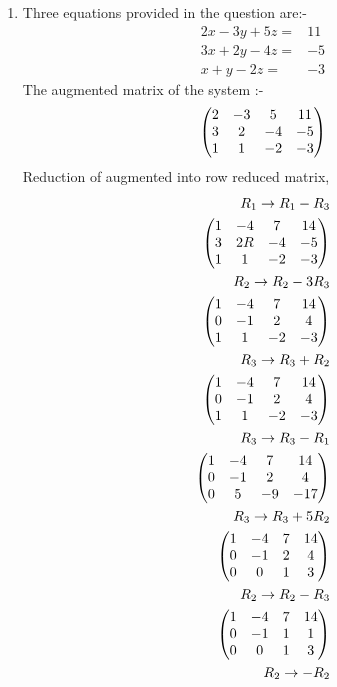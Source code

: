 \documentclass[two column]{article}
\begin{document}
            \begin{enumerate}
            \item
            Three equations provided in the question are:-
               \begin{align}
                   2x-3y+5z=&11\\
                   3x+2y-4z=&-5\\
                   x+y-2z=&-3
               \end{align}
                 The augmented matrix of the system :-
                 \begin{align}
                 \begin{pmatrix} 2 & -3 & 5 & 11\\ 3 & 2 & -4 & -5\\ 1 & 1 & -2 & -3\end{pmatrix}
                 \end{align}
                  Reduction of  augmented into row reduced matrix,
                  \begin{align}
                  R_1\rightarrow  R_1-R_3\\
                  \myvec{1&-4&7&14\\3&2R&-4&-5\\1&1&-2&-3}\\
                  R_2 \rightarrow R_2-3R_3\\
                  \myvec{1&-4&7&14\\0&-1&2&4\\1&1&-2&-3}\\
                  R_3 \rightarrow R_3+R_2\\
                  \myvec{1&-4&7&14\\0&-1&2&4\\1&1&-2&-3}\\
                  R_3 \rightarrow R_3-R_1\\
                  \myvec{1&-4&7&14\\0&-1&2&4\\0&5&-9&-17}\\
                  R_3 \rightarrow R_3+5R_2\\
                  \myvec{1&-4&7&14\\0&-1&2&4\\0&0&1&3}\\
                  R_2 \rightarrow R_2-R_3\\
                  \myvec{1&-4&7&14\\0&-1&1&1\\0&0&1&3}\\
                  R_2 \rightarrow -R_2\\                  

\end{align}
\end{enumerate}
\end{document}
